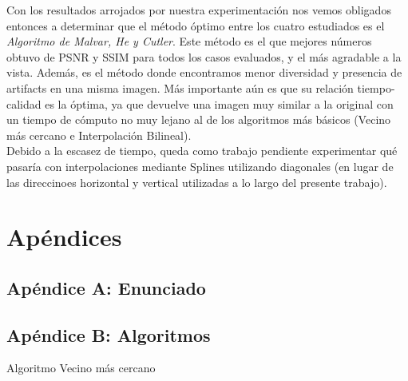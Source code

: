 \documentclass[a4paper]{article}
\begin{document}
Con los resultados arrojados por nuestra experimentaci\'on nos vemos obligados entonces a determinar que el m\'etodo \'optimo entre los cuatro estudiados es el \textit{Algoritmo de Malvar, He y Cutler}. Este m\'etodo es el que mejores n\'umeros obtuvo de PSNR y SSIM para todos los casos evaluados, y el más agradable a la vista. Adem\'as, es el m\'etodo donde encontramos menor diversidad y presencia de artifacts en una misma imagen. M\'as importante a\'un es que su relaci\'on tiempo-calidad es la \'optima, ya que devuelve una imagen muy similar a la original con un tiempo de c\'omputo no muy lejano al de los algoritmos m\'as b\'asicos (Vecino m\'as cercano e Interpolación Bilineal). \\

Debido a la escasez de tiempo, queda como trabajo pendiente experimentar qué pasaría con interpolaciones mediante Splines utilizando diagonales (en lugar de las direccinoes horizontal y vertical utilizadas a lo largo del presente trabajo).\\

\section{Ap\'endices}
\subsection{Ap\'endice A: Enunciado} 



\subsection{Ap\'endice B: Algoritmos}

\begin{algorithm}[h!]
\NoCaptionOfAlgo
\caption{Algoritmo Vecino m\'as cercano}
\end{algorithm}
\end{document}
